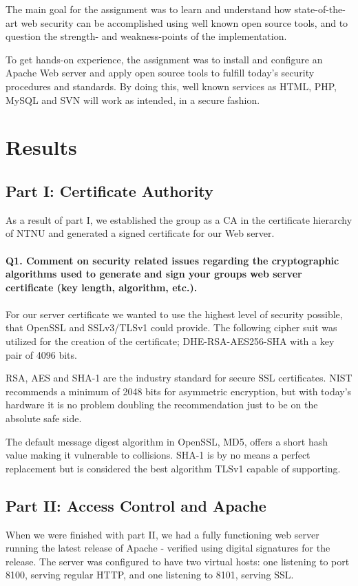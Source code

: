 \documentclass[a4paper, 12pt]{article}
\begin{document}
The main goal for the assignment was to learn and understand how state-of-the-art web security can be accomplished using well known open source tools, and to question the strength- and weakness-points of the implementation.

To get hands-on experience, the assignment was to install and configure an Apache Web server and apply open source tools to fulfill today’s security procedures and standards. By doing this, well known services as HTML, PHP, MySQL and SVN will work as intended, in a secure fashion.


\section{Results}

\subsection{Part I: Certificate Authority}
As a result of part I, we established the group as a CA in the certificate hierarchy of NTNU and generated a signed certificate for our Web server. \\ \\
{\bf Q1. Comment on security related issues regarding the cryptographic algorithms used to
generate and sign your groups web server certificate (key length, algorithm, etc.).}
\\ \\
For our server certificate we wanted to use the highest level of security possible, that OpenSSL and SSLv3/TLSv1 could provide. The following cipher suit was utilized for the creation of the certificate; DHE-RSA-AES256-SHA with a key pair of 4096 bits.

RSA, AES and SHA-1 are the industry standard for secure SSL certificates. NIST recommends a minimum of 2048 bits\cite{nistkey} for asymmetric encryption, but with today's hardware it is no problem doubling the recommendation just to be on the absolute safe side.

The default message digest algorithm in OpenSSL, MD5, offers a short hash value making it vulnerable to collisions. SHA-1 is by no means a perfect replacement but is considered the best algorithm TLSv1 capable of supporting. 
\subsection{Part II: Access Control and Apache}
When we were finished with part II, we had a fully functioning web server running the latest release of Apache - verified using digital signatures for the release. The server was configured to have two virtual hosts: one listening to port 8100, serving regular HTTP, and one listening to 8101, serving SSL.
\end{document}
